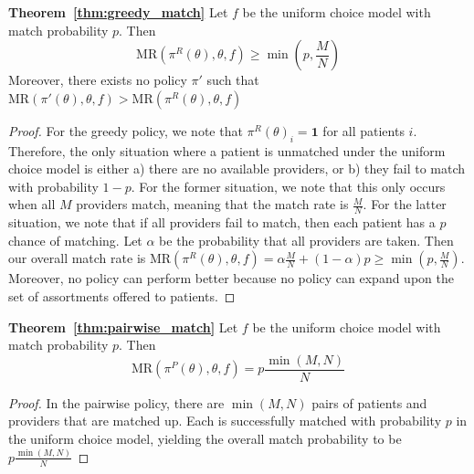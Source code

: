 \documentclass[11pt]{article}
\begin{document}
\textbf{Theorem~\ref{thm:greedy_match}}
Let $f$ be the uniform choice model with match probability $p$. 
Then 
\begin{equation}
    \mathrm{MR}(\pi^{R}(\theta),\theta,f)  \geq \min(p,\frac{M}{N})
\end{equation}
Moreover, there exists no policy $\pi'$ such that $\mathrm{MR}(\pi'(\theta),\theta,f) > \mathrm{MR}(\pi^{R}(\theta),\theta,f)$

\begin{proof}
     
    For the greedy policy, we note that $\pi^{R}(\theta)_{i} = \mathbf{1}$ for all patients $i$. 
    Therefore, the only situation where a patient is unmatched under the uniform choice model is either a) there are no available providers, or b) they fail to match with probability $1-p$. 
    For the former situation, we note that this only occurs when all $M$ providers match, meaning that the match rate is $\frac{M}{N}$. 
    For the latter situation, we note that if all providers fail to match, then each patient has a $p$ chance of matching.
    Let $\alpha$ be the probability that all providers are taken. 
    Then our overall match rate is $\mathrm{MR}(\pi^{R}(\theta),\theta,f) = \alpha \frac{M}{N} + (1-\alpha) p \geq \min(p,\frac{M}{N})$. 
    Moreover, no policy can perform better because no policy can expand upon the set of assortments offered to patients. 
\end{proof}

\textbf{Theorem~\ref{thm:pairwise_match}}
Let $f$ be the uniform choice model with match probability $p$. 
Then 
\begin{equation}
    \mathrm{MR}(\pi^{P}(\theta),\theta,f)  = p \frac{\min(M,N)}{N}
\end{equation}

\begin{proof}
     
    In the pairwise policy, there are $\min(M,N)$ pairs of patients and providers that are matched up. 
    Each is successfully matched with probability $p$ in the uniform choice model, yielding the overall match probability to be $p \frac{\min(M,N)}{N}$
\end{proof}
\end{document}
